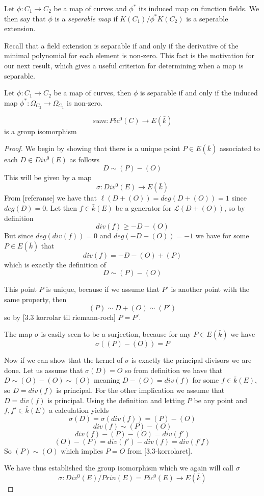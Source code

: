 \begin{mydef}
 Let $\phi: C_1 \rightarrow C_2$ be a map of curves and $\phi^*$ its induced map on
function fields. We then say that $\phi$ is a \emph{seperable map} if
$K(C_1)/\phi^* K(C_2)$ is a seperable extension.
\end{mydef}

Recall that a field extension is separable if and only if the derivative of the minimal
polynomial for each element is non-zero. This fact is the motivation for our next result,
which gives a useful criterion for determining when a map is separable.

\begin{prop}
 Let $\phi: C_1 \rightarrow C_2$ be a map of curves, then $\phi$ is separable if and only if
the induced map $\phi^*: \Omega_{C_2} \rightarrow \Omega_{C_1} $ is non-zero.
\end{prop}

\begin{thm}
 $$ sum: Pic^0(C) \rightarrow E(\bar{k}) $$
is a group isomorphism
\end{thm}
\begin{proof}
 We begin by showing that there is a unique point $P \in E(\bar{k})$ associated to
each $D \in Div^0(E)$ as follows
$$ D \sim (P) -(O) $$
This will be given by a map
$$ \sigma: Div^0(E) \rightarrow E(\bar{k}) $$
From [referanse] we have that $\ell(D+(O)) = deg(D+(O)) = 1$ since $deg(D) = 0$.
Let then $f \in \bar{k}(E)$ be a generator for $\mathscr{L}(D+(O))$, so by definition
$$ div(f) \geq -D-(O) $$
But since $deg(div(f)) = 0$ and $deg(-D-(O)) = -1$ we have for some $P \in E(\bar{k})$ that
$$ div(f) = -D-(O)+(P) $$
which is exactly the definition of
$$ D \sim (P) - (O) $$

This point $P$ is unique, because if we assume that $P'$ is another point with the same
property, then
$$ (P) \sim D + (O) \sim (P') $$
so by [3.3 korrolar til riemann-roch]
$ P = P'$.

The map $\sigma$ is easily seen to be a surjection, because for any $P \in E(\bar{k})$ we have
$$ \sigma((P)-(O)) = P $$

Now if we can show that the kernel of $\sigma$ is exactly the principal divisors we are done.
Let us assume that $\sigma(D) = O$ so from definition we have that $D \sim (O)-(O) \sim (O)$
meaning $D - (O) = div(f)$ for some $f \in \bar{k}(E)$, so $D = div(f)$ is principal.
For the other implication we assume that $D = div(f)$ is principal. Using the definition and
letting $P$ be any point and $f, f' \in \bar{k}(E)$ a calculation yields
$$ \sigma(D) = \sigma(div(f)) = (P)-(O) $$
$$ div(f) \sim (P) - (O) $$
$$ div(f) - (P) - (O) = div(f') $$
$$ (O) - (P) = div(f') - div(f) = div(f' f) $$
So $ (P) \sim (O) $ which implies $P = O$ from [3.3-korrolaret].

We have thus established the group isomorphism which we again will call $\sigma$
$$ \sigma : Div^0(E)/Prin(E) = Pic^0(E) \rightarrow E(\bar{k}) $$

\end{proof}

